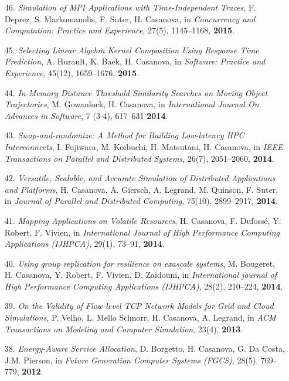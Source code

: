 \begin{enumerate}
\item [46.] {\it Simulation of MPI Applications with Time-Independent Traces},
F. Deprez, S. Markomanolis, F. Suter, H. Casanova,
in \emph{Concurrency and Computation: Practice and Experience},
27(5), 1145--1168, {\bf 2015}.

\item [45.] {\it Selecting Linear Algebra Kernel Composition Using Response
Time Prediction}, A. Hurault, K. Baek, H. Casanova, in \emph{Software:
Practice and Experience}, 45(12), 1659--1676, {\bf 2015}.

\item [44.] {\it In-Memory Distance Threshold Similarity Searches on Moving
Object Trajectories}, M. Gowanlock, H. Casanova, in \emph{International
Journal On Advances in Software},  7 (3-4), 617--631 {\bf 2014}.

\item [43.] {\it Swap-and-randomize: A Method for Building Low-latency HPC Interconnects}, I. Fujiwara, M. Koibuchi, H. Matsutani, H. Casanova,
    in \emph{IEEE Transactions on Parallel and Distributed Systems}, 26(7),  2051--2060,  {\bf 2014}.

\item [42.] {\it Versatile, Scalable, and Accurate Simulation of Distributed Applications and Platforms},
H. Casanova, A. Giersch, A. Legrand, M. Quinson, F. Suter,
in \emph{Journal of Parallel and Distributed Computing},
75(10), 2899--2917, {\bf 2014}.

\item [41.] {\it Mapping Applications on Volatile Resources},
H. Casanova, F. Dufoss\'e, Y. Robert, F. Vivien,
in \emph{International Journal of High Performance Computing Applications (IJHPCA)}, 29(1), 73--91, {\bf 2014}.

\item[40.] {\it Using group replication for resilience on exascale systems},
M. Bougeret, H. Casanova, Y. Robert, F. Vivien, D. Zaidouni,
in \emph{International journal of High Performance Computing Applications (IJHPCA)},
28(2), 210--224, {\bf 2014}.

\item[39.] {\it On the Validity of Flow-level TCP Network Models for Grid and Cloud Simulations}, P. Velho, L. Mello Schnorr, H. Casanova, A. Legrand,
in \emph{ACM Transactions on Modeling and Computer Simulation}, 23(4),
{\bf 2013}.

\item[38.] {\it Energy-Aware Service Allocation}, D. Borgetto, H. Casanova, G. Da Costa, J.M. Pierson, in \emph{Future Generation Computer Systems (FGCS)}, 28(5), 769--779, {\bf 2012}.


\end{enumerate}
